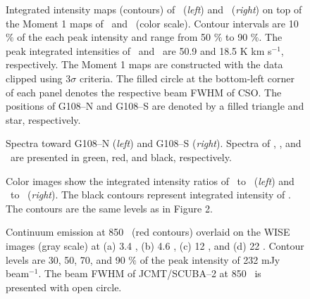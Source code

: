 \documentclass[manuscript]{aastex}
\begin{document}
\begin{figure}[!p]
\begin{center}
\caption{Integrated intensity maps (contours) of \tcot\ (\textit{left}) and \thcot\ (\textit{right}) on top of the Moment 1 maps of \tcot\ and \thcot\ (color scale).
Contour intervals are 10 $\%$ of the each peak intensity and range from 50 $\%$ to 90 $\%$.
The peak integrated intensities of \tcot\ and \thcot\ are 50.9 and 18.5 K km s$^{-1}$, respectively.
The Moment 1 maps are constructed with the data clipped using 3$\sigma$ criteria.
The filled circle at the bottom-left corner of each panel denotes the respective beam FWHM of CSO.
The positions of G108--N and G108--S are denoted by a filled triangle and star, respectively.}
\end{center}
\end{figure}
\clearpage


\begin{figure}[!p]
\begin{center}
\caption{Spectra toward G108--N (\textit{left}) and G108--S (\textit{right}).
Spectra of \tcot, \thcot, and \ceot\ are presented in green, red, and black, respectively.}
\end{center}
\end{figure}

\clearpage

\begin{figure}[!p]
\begin{center}
\caption{Color images show the integrated intensity ratios of \tcot\ to \tco\ (\textit{left}) and \thcot\ to \thco\ (\textit{right}).
The black contours represent integrated intensity of \thcot.
The contours are the same levels as in Figure 2.
}
\end{center}
\end{figure}
\clearpage




\begin{figure}[!p]
\begin{center}
\caption{Continuum emission at 850 \m\ (red contours) overlaid on the WISE images (gray scale) at (a) 3.4 \m, (b) 4.6 \m, (c) 12 \m, and (d) 22 \m.
Contour levels are 30, 50, 70, and 90 $\%$ of the peak intensity of 232 mJy beam$^{-1}$.
The beam FWHM of JCMT/SCUBA--2 at 850 \m\ is presented with open circle.
}
\end{center}
\end{figure}
\clearpage
\end{document}
